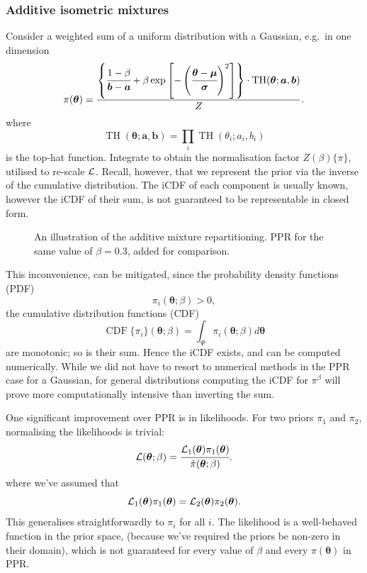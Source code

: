\documentclass[usenatbib]{mnras}
\DeclareMathOperator{\TopHat}{TH}
\DeclareMathOperator{\CDF}{CDF}
\begin{document}
\subsubsection{Additive isometric mixtures}\label{sec:org418133f}
Consider a weighted sum of a uniform distribution with
a Gaussian, e.g.~in one dimension
\begin{equation}\label{eq:additive-mix}
  \pi(\bm{\theta}) = \frac{ \left\lbrace \cfrac{1- \beta} {\bm{b} - \bm{a}} + \beta \exp \left[ -\left(\cfrac{\bm{\theta} - \bm{\mu}}{\bm{\sigma}} \right)^{2}\right]\right\rbrace \cdot \TopHat(\bm{\theta}; \bm{a}, \bm{b})}{Z}.
\end{equation}
where \[\TopHat(\bm{\theta};\bm{a},\bm{b}) = \prod_{i}
	\TopHat(\theta_{i}; a_{i}, b_{i})\] is the top-hat function. Integrate
to obtain the normalisation factor \(Z(\beta)\{\pi\}\), utilised
to re-scale \({\cal L}\). Recall, however, that we represent the
prior via the inverse of the cumulative distribution. The iCDF of
each component is usually known, however the iCDF of their sum, is
not guaranteed to be representable in closed form.

\begin{figure}
  
\caption{\label{orgda3e5e9}
An illustration of the additive mixture repartitioning. PPR for the same value of \(\beta=0.3\), added for comparison.}
\end{figure}

This inconvenience, can be mitigated, since the probability
density functions (PDF) \[\pi_{i}(\bm{\theta}; \beta) >0,\] the
cumulative distribution functions (CDF)
\[\CDF\{\pi_{i}\}(\bm{\theta};\beta) = \int_{\Psi}
	\pi_{i}(\bm{\theta}; \beta)d\bm{\theta}\] are monotonic;
so is their sum. Hence the iCDF exists, and can be computed
numerically. While we did not have to resort to numerical methods
in the PPR case for a Gaussian, for general distributions
computing the iCDF for \(\pi^{\beta}\) will prove more
computationally intensive than inverting the sum.

One significant improvement over PPR is in likelihoods. For two
priors \(\pi_{1}\) and \(\pi_{2}\), normalising the likelihoods is
trivial:
\begin{equation}
{\cal L}(\bm{\theta}; \beta) = \cfrac{{\cal L}_{1}(\bm{\theta}) \pi_{1}(\bm{\theta})}{\tilde{\pi}(\bm{\theta}; \beta)}.
\end{equation}
where we've assumed that \[{\cal L}_{1}(\bm{\theta})\pi_{1}(\bm{\theta})
	={\cal L}_{2}(\bm{\theta}) \pi_{2}(\bm{\theta}).\] This generalises
straightforwardly to \(\pi_{i}\) for all \(i\). The likelihood is a
well-behaved function in the prior space, (because we've required
the priors be non-zero in their domain), which is not guaranteed
for every value of \(\beta\) and every \(\pi(\bm{\theta})\) in PPR.
\end{document}
